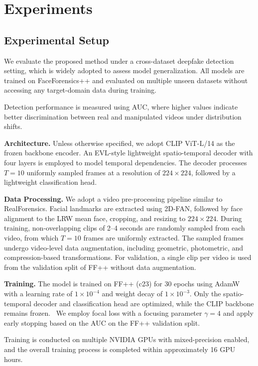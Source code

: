\documentclass[runningheads]{llncs}
\begin{document}
\section{Experiments}
\label{sec:experiments}

\subsection{Experimental Setup}

We evaluate the proposed method under a cross-dataset deepfake detection setting, which is widely adopted to assess model generalization.
All models are trained on FaceForensics++ and evaluated on multiple unseen datasets without accessing any target-domain data during training.

Detection performance is measured using AUC, where higher values indicate better discrimination between real and manipulated videos under distribution shifts.

\textbf{Architecture.}
Unless otherwise specified, we adopt CLIP ViT-L/14 as the frozen backbone encoder.
An EVL-style lightweight spatio-temporal decoder with four layers is employed to model temporal dependencies.
The decoder processes $T=10$ uniformly sampled frames at a resolution of $224 \times 224$, followed by a lightweight classification head.

\textbf{Data Processing.}
We adopt a video pre-processing pipeline similar to RealForensics.
Facial landmarks are extracted using 2D-FAN, followed by face alignment to the LRW mean face, cropping, and resizing to $224 \times 224$.
During training, non-overlapping clips of 2--4 seconds are randomly sampled from each video, from which $T=10$ frames are uniformly extracted.
The sampled frames undergo video-level data augmentation, including geometric, photometric, and compression-based transformations.
For validation, a single clip per video is used from the validation split of FF++ without data augmentation.

\textbf{Training.}
The model is trained on FF++ (c23) for 30 epochs using AdamW with a learning rate of $1 \times 10^{-4}$ and weight decay of $1 \times 10^{-3}$.
Only the spatio-temporal decoder and classification head are optimized, while the CLIP backbone remains frozen.  
We employ focal loss with a focusing parameter $\gamma=4$ and apply early stopping based on the AUC on the FF++ validation split.

Training is conducted on multiple NVIDIA GPUs with mixed-precision enabled, and the overall training process is completed within approximately 16 GPU hours.
\end{document}
